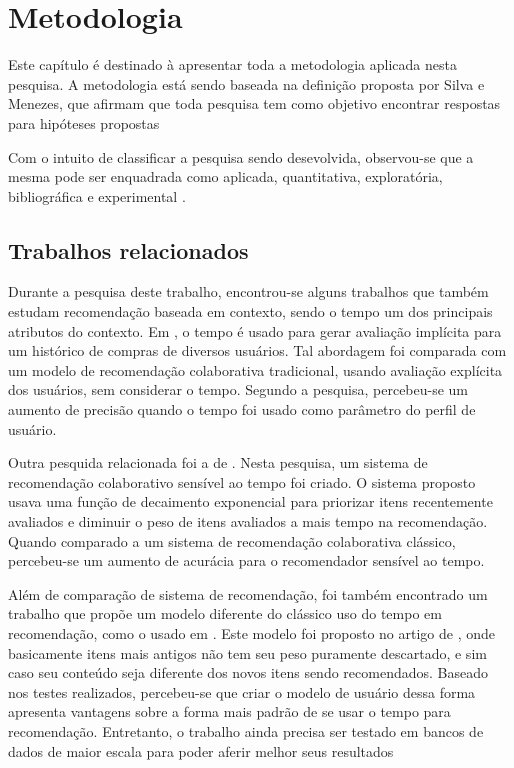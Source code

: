 \chapter[Metodologia]{Metodologia}

Este capítulo é destinado à apresentar toda a metodologia aplicada nesta
pesquisa. A metodologia está sendo baseada na definição proposta por Silva e Menezes, que afirmam que toda pesquisa
tem como objetivo encontrar respostas para hipóteses propostas
\cite{da2005metodologia}

Com o intuito de classificar a pesquisa sendo desevolvida, observou-se que a
mesma pode ser enquadrada como aplicada, quantitativa, exploratória, bibliográfica e
experimental \cite{da2005metodologia}.


\section{Trabalhos relacionados}

Durante a pesquisa deste trabalho, encontrou-se alguns trabalhos que também estudam recomendação baseada em contexto, sendo o tempo um dos
principais atributos do contexto. Em \cite{lee2008time}, o tempo é usado para gerar avaliação implícita para um histórico de
compras de diversos usuários. Tal abordagem foi comparada com um modelo de recomendação colaborativa tradicional, usando avaliação explícita dos usuários,
sem considerar o tempo. Segundo a pesquisa, percebeu-se um aumento de precisão
quando o tempo foi usado como parâmetro do perfil de usuário.

Outra pesquida relacionada foi a de \cite{ding2005time}. Nesta pesquisa, um
sistema de recomendação colaborativo sensível ao tempo foi criado. O sistema proposto usava uma função de
decaimento exponencial para priorizar itens recentemente avaliados e diminuir o peso de itens avaliados a mais tempo na recomendação.
Quando comparado a um sistema de
recomendação colaborativa clássico, percebeu-se um aumento de acurácia para o recomendador sensível ao tempo.

Além de comparação de sistema de recomendação, foi também encontrado um trabalho que propõe um modelo diferente do clássico uso do tempo em recomendação, como o usado em
\cite{ding2005time}. Este modelo foi proposto no artigo de \cite{basile2015modeling}, onde basicamente itens mais antigos não tem seu peso puramente descartado, e sim caso
seu conteúdo seja diferente dos novos itens sendo recomendados. Baseado nos
testes realizados, percebeu-se que criar o modelo de usuário dessa forma apresenta vantagens sobre
a forma mais padrão de se usar o tempo para recomendação. Entretanto, o trabalho ainda precisa ser testado em bancos de dados de maior escala para poder aferir melhor
seus resultados

